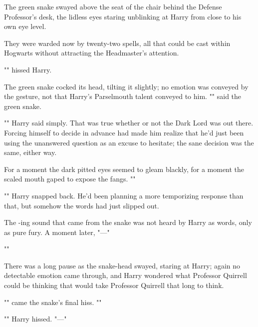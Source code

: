The green snake swayed above the seat of the chair behind the Defense
Professor's desk, the lidless eyes staring unblinking at Harry from close to
his own eye level.

They were warded now by twenty-two spells, all that could be cast within
Hogwarts without attracting the Headmaster's attention.

"" hissed Harry.

The green snake cocked its head, tilting it slightly; no emotion was conveyed
by the gesture, not that Harry's Parselmouth talent conveyed to him.
"" said the green snake.

"" Harry said simply. That was true whether or not the Dark
Lord was out there. Forcing himself to decide in advance had made him realize
that he'd just been using the unanswered question as an excuse to hesitate; the
sane decision was the same, either way.

For a moment the dark pitted eyes seemed to gleam blackly, for a moment the
scaled mouth gaped to expose the fangs. ""

"" Harry snapped back.
He'd been planning a more temporizing response than that, but somehow the words
had just slipped out.

The -ing sound that came from the snake was not heard by Harry as
words, only as pure fury. A moment later, "—"

""

There was a long pause as the snake-head swayed, staring at Harry; again no
detectable emotion came through, and Harry wondered what Professor Quirrell
could be thinking that would take Professor Quirrell that long to think.

"" came the snake's final
hiss. ""

"" Harry hissed. "—"

